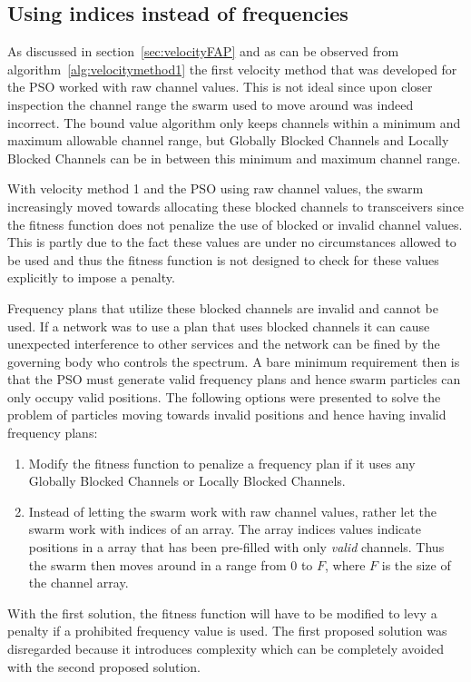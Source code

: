 \subsection{Using indices instead of frequencies}
\label{sec:velocityFAP2}
As discussed in section~\ref{sec:velocityFAP} and as can be observed from algorithm~\ref{alg:velocitymethod1} the first velocity method that was developed for the PSO worked with raw channel values. This is not ideal since upon closer inspection the channel range the swarm used to move around was indeed incorrect. The bound value algorithm only keeps channels within a minimum and maximum allowable channel range, but Globally Blocked Channels and Locally Blocked Channels can be in between this minimum and maximum channel range. 

With velocity method 1 and the PSO using raw channel values, the swarm increasingly moved towards allocating these blocked channels to transceivers since the fitness function does not penalize the use of blocked or invalid channel values. This is partly due to the fact these values are under no circumstances allowed to be used and thus the fitness function is not designed to check for these values explicitly to impose a penalty.

Frequency plans that utilize these blocked channels are invalid and cannot be used. If a network was to use a plan that uses blocked channels it can cause unexpected interference to other services and the network can be fined by the governing body who controls the spectrum. A bare minimum requirement then is that the PSO must generate valid frequency plans and hence swarm particles can only occupy valid positions. The following options were presented to solve the problem of particles moving towards invalid positions and hence having invalid frequency plans:
\begin{enumerate}
\item Modify the fitness function to penalize a frequency plan if it uses any Globally Blocked Channels or Locally Blocked Channels.
\item Instead of letting the swarm work with raw channel values, rather let the swarm work with indices of an array. The array indices values indicate positions in a array that has been pre-filled with only \emph{valid} channels. Thus the swarm then moves around in a range from 0 to $F$, where $F$ is the size of the channel array.
\end{enumerate}

With the first solution, the fitness function will have to be modified to levy a penalty if a prohibited frequency value is used. The first proposed solution was disregarded because it introduces complexity which can be completely avoided with the second proposed solution.

